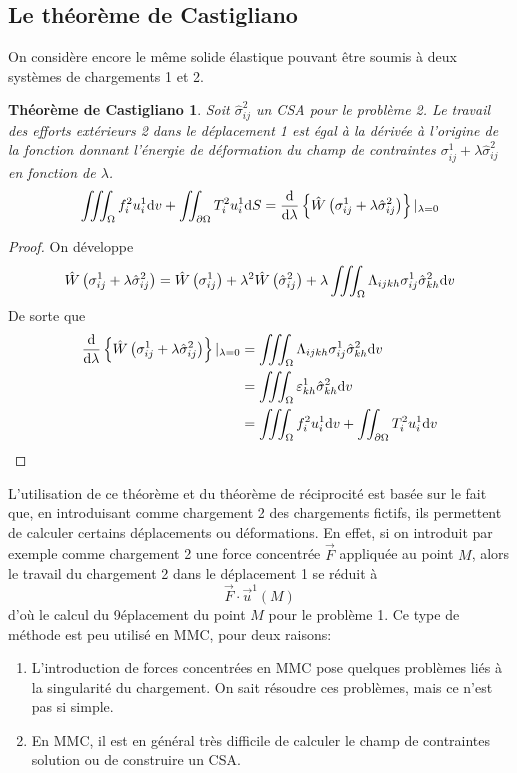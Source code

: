 \subsection{Le théorème de Castigliano} \label{ssec:Ch09-2.2}
On considère encore le même solide élastique pouvant être soumis à deux systèmes de chargements 1 et 2. 
\newtheorem*{ThCast}{Théorème de Castigliano}
\begin{ThCast}
    Soit $\hat{\sigma}_{ij}^2$ un CSA pour le problème 2.
    Le travail des efforts extérieurs 2 dans le déplacement 1 est égal à la dérivée à l'origine de la fonction donnant l'énergie de déformation du champ de contraintes $\sigma_{ij}^1 + \lambda \hat{\sigma}_{ij}^2$ en fonction de $\lambda$.
    \begin{equation}
        \iiint_{\Omega} f_i^2 u_i^1 \mathrm{d} v + \iint_{\partial \Omega} T_i^2 u_i^1 \mathrm{d} S = \frac{\mathrm{d}}{\mathrm{d} \lambda} \left\{ \hat{W}\left( \sigma_{ij}^1 + \lambda \hat{\sigma}_{ij}^2 \right) \right\} |_{\lambda=0}
        \label{eq:Ch09-062}
    \end{equation}
\end{ThCast}
\begin{proof}
    On développe 
    \[
    \hat{W}\left( \sigma_{ij}^1 + \lambda \hat{\sigma}_{ij}^2 \right) = \hat{W} \left( \sigma_{ij}^1 \right) + \lambda^2 \hat{W}\left( \hat{\sigma}_{ij}^2 \right) + \lambda \iiint_{\Omega} \Lambda_{ijkh} \sigma_{ij}^1 \hat{\sigma}_{kh}^2 \mathrm{d} v
    \]
    De sorte que 
    \begin{align*}
    \frac{\mathrm{d}}{\mathrm{d} \lambda} \left\{ \hat{W}\left( \sigma_{ij}^1 + \lambda \hat{\sigma}_{ij}^2 \right) \right\} |_{\lambda=0} &= \iiint_{\Omega} \Lambda_{ijkh} \sigma_{ij}^1 \hat{\sigma}_{kh}^2 \mathrm{d} v \\
        &= \iiint_{\Omega} \varepsilon_{kh}^1 \hat{\sigma}_{kh}^2 \mathrm{d} v \\
        &= \iiint_{\Omega} f_i^2 u_i^1 \mathrm{d} v + \iint_{\partial \Omega} T_i^2 u_i^1 \mathrm{d} v
    \end{align*}
\end{proof}

L'utilisation de ce théorème et du théorème de réciprocité est basée sur le fait que, en introduisant comme chargement 2 des chargements fictifs, ils permettent de calculer certains déplacements ou déformations.
En effet, si on introduit par exemple comme chargement 2 une force concentrée $\vec{F}$ appliquée au point $M$, alors le travail du  chargement 2 dans le déplacement 1 se réduit à
\begin{equation}
    \vec{F}\cdot \vec{u}^1 \left( M\right)
    \label{eq:Ch09-063}
\end{equation}
d'où le calcul du 9éplacement du point $M$ pour le problème 1.
Ce type de méthode est peu utilisé en MMC, pour deux raisons: 
\begin{enumerate}
    \item L'introduction de forces concentrées en MMC pose quelques problèmes liés à la singularité du chargement.
        On sait résoudre ces problèmes, mais ce n'est pas si simple. 
    \item En MMC, il est en général très difficile de calculer le champ de contraintes solution ou de construire un CSA. 
\end{enumerate}


